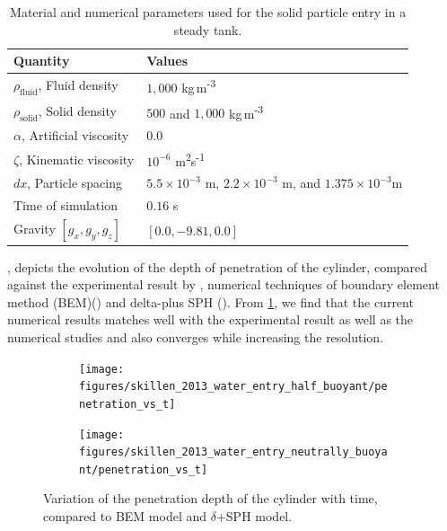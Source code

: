 \documentclass[preprint,12pt]{elsarticle}
\begin{document}
\begin{table}[!ht]
  \centering
  \begin{tabular}[!ht]{ll}
    \toprule
    Quantity & Values\\
    \midrule
    $\rho_{\text{fluid}}$, Fluid density & $1,000$ kg\,m\textsuperscript{-3} \\
    $\rho_{\text{solid}}$, Solid density & $500$ and $1,000$ kg\,m\textsuperscript{-3} \\
    $\alpha$, Artificial viscosity & $0.0$ \\
    $\zeta$, Kinematic viscosity & $10^{-6}$ m\textsuperscript{2}s\textsuperscript{-1}\\
    $dx$, Particle spacing & $5.5 \times 10^{-3}$ m, $2.2 \times 10^{-3}$ m, and
$1.375 \times 10^{-3}$m \\
    Time of simulation & $0.16$ s \\
    Gravity $[g_x, g_y, g_z]$ & $[0.0, -9.81, 0.0]$\\
    \bottomrule
  \end{tabular}
  \caption{Material and numerical parameters used for the solid particle
    entry in a steady tank.}%
  \label{tab:rfc_validation_1}
\end{table}


, depicts the evolution of the
depth of penetration of the cylinder, compared against the experimental result
by \citet{greenhow1983nonlinear}, numerical techniques of boundary element
method (BEM)(\cite{sun2006water}) and delta-plus SPH
(\cite{sun2018accurate}). From \cref{fig:result_rfc_01_result_displacement},
we find that the current numerical results matches well with the experimental result as
well as the numerical studies and also converges while increasing the
resolution.
\begin{figure}[!htpb]
  \centering
  \begin{subfigure}{0.48\textwidth}
    \centering
    \texttt{[image: figures/skillen\_2013\_water\_entry\_half\_buoyant/penetration\_vs\_t]}
  \end{subfigure}
  \begin{subfigure}{0.48\textwidth}
    \centering
    \texttt{[image: figures/skillen\_2013\_water\_entry\_neutrally\_buoyant/penetration\_vs\_t]}
  \end{subfigure}
  \caption{Variation of the penetration depth of the cylinder with time,
    compared to BEM model \cite{sun2006water} and $\delta$+SPH model\cite{sun2018accurate}.}
\label{fig:result_rfc_01_result_displacement}
\end{figure}
\end{document}
